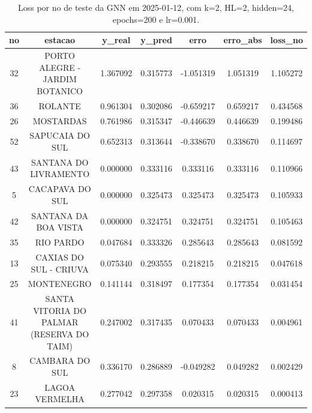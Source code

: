 \begin{table}[h]
\centering
\caption{Loss por no de teste da GNN em 2025-01-12, com k=2, HL=2, hidden=24, epochs=200 e lr=0.001.}
\label{tab:gnn_loss_k2_hl2_h24_e200_d20250112}
\begin{tabular}{ccccccc}
\toprule
no & estacao & y\_real & y\_pred & erro & erro\_abs & loss\_no \\
\midrule
32 & PORTO ALEGRE - JARDIM BOTANICO & 1.367092 & 0.315773 & -1.051319 & 1.051319 & 1.105272 \\
36 & ROLANTE & 0.961304 & 0.302086 & -0.659217 & 0.659217 & 0.434568 \\
26 & MOSTARDAS & 0.761986 & 0.315347 & -0.446639 & 0.446639 & 0.199486 \\
52 & SAPUCAIA DO SUL & 0.652313 & 0.313644 & -0.338670 & 0.338670 & 0.114697 \\
43 & SANTANA DO LIVRAMENTO & 0.000000 & 0.333116 & 0.333116 & 0.333116 & 0.110966 \\
5 & CACAPAVA DO SUL & 0.000000 & 0.325473 & 0.325473 & 0.325473 & 0.105933 \\
42 & SANTANA DA BOA VISTA & 0.000000 & 0.324751 & 0.324751 & 0.324751 & 0.105463 \\
35 & RIO PARDO & 0.047684 & 0.333326 & 0.285643 & 0.285643 & 0.081592 \\
13 & CAXIAS DO SUL - CRIUVA & 0.075340 & 0.293555 & 0.218215 & 0.218215 & 0.047618 \\
25 & MONTENEGRO & 0.141144 & 0.318497 & 0.177354 & 0.177354 & 0.031454 \\
41 & SANTA VITORIA DO PALMAR (RESERVA DO TAIM) & 0.247002 & 0.317435 & 0.070433 & 0.070433 & 0.004961 \\
8 & CAMBARA DO SUL & 0.336170 & 0.286889 & -0.049282 & 0.049282 & 0.002429 \\
23 & LAGOA VERMELHA & 0.277042 & 0.297358 & 0.020315 & 0.020315 & 0.000413 \\
\bottomrule
\end{tabular}
\end{table}
